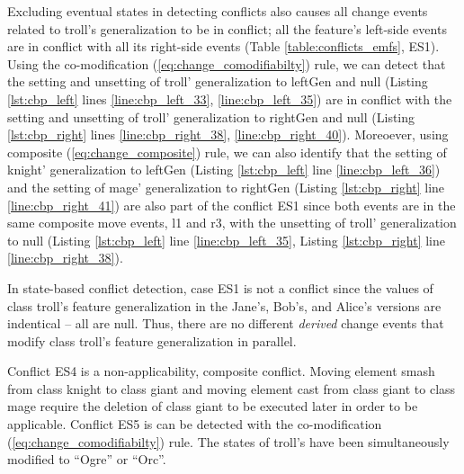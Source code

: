 
Excluding eventual states in detecting conflicts also causes all change events related to \textsf{troll}'s \textsf{generalization} to be in conflict; all the feature's left-side events are in conflict with all its right-side events (Table \ref{table:conflicts_emfs}, ES1). Using the co-modification  (\ref{eq:change_comodifiabilty}) rule, we can detect that the setting and unsetting of \textsf{troll}' \textsf{generalization} to \textsf{leftGen} and \textsf{null} (Listing \ref{lst:cbp_left} lines \ref{line:cbp_left_33}, \ref{line:cbp_left_35}) are in conflict with the setting and unsetting of \textsf{troll}' \textsf{generalization} to \textsf{rightGen} and \textsf{null} (Listing \ref{lst:cbp_right} lines \ref{line:cbp_right_38}, \ref{line:cbp_right_40}). Moreoever, using composite (\ref{eq:change_composite}) rule, we can also identify that the setting of \textsf{knight}' \textsf{generalization} to \textsf{leftGen} (Listing \ref{lst:cbp_left} line \ref{line:cbp_left_36}) and the setting of \textsf{mage}' \textsf{generalization} to \textsf{rightGen} (Listing \ref{lst:cbp_right} line \ref{line:cbp_right_41}) are also part of the conflict ES1 since both events are in the same composite move events, \textsf{l1} and \textsf{r3}, with the unsetting of \textsf{troll}' \textsf{generalization} to  \textsf{null} (Listing \ref{lst:cbp_left} line \ref{line:cbp_left_35}, Listing \ref{lst:cbp_right} line \ref{line:cbp_right_38}).

In state-based conflict detection, case ES1 is not a conflict since the values of class \textsf{troll}'s feature \textsf{generalization} in the Jane's, Bob's, and Alice's versions are indentical -- all are null. Thus, there are no different \textit{derived} change events that modify class \textsf{troll}'s feature \textsf{generalization} in parallel. 

Conflict ES4 is a non-applicability, composite conflict. Moving element \textsf{smash} from class \textsf{knight} to class \textsf{giant} and moving element \textsf{cast} from class \textsf{giant} to class \textsf{mage} require the deletion of class \textsf{giant} to be executed later in order to be applicable. Conflict ES5 is can be detected with the co-modification  (\ref{eq:change_comodifiabilty}) rule. The states of \textsf{troll}'s  have been simultaneously modified to ``Ogre'' or ``Orc''.

